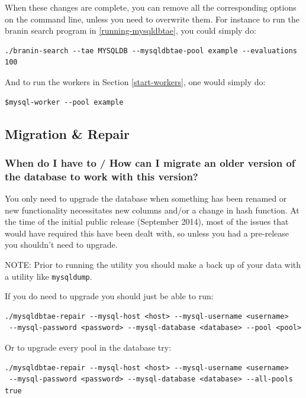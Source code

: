\documentclass[11pt,letterpaper,oneside]{article}
\begin{document}
When these changes are complete, you can remove all the corresponding options on the command line, unless you need to overwrite them. For instance to run the branin search program in \ref{running-mysqldbtae}, you could simply do:

\begin{verbatim}
./branin-search --tae MYSQLDB --mysqldbtae-pool example --evaluations 100
\end{verbatim}


And to run the workers in Section \ref{start-workers}, one would simply do:
\begin{verbatim}
$mysql-worker --pool example  
\end{verbatim}


\subsection{Migration \& Repair}
\label{repair}

\subsubsection{When do I have to / How can I migrate an older version of the database to work with this version?}

You only need to upgrade the database when something has been renamed or new functionality necessitates new columns and/or a change in hash function. At the time of the initial public release (September 2014), most of the issues that would have required this have been dealt with, so unless you had a pre-release you shouldn't need to upgrade. 

\textsc{NOTE}: Prior to running the utility you should make a back up of your data with a utility like \texttt{mysqldump}.


If you do need to upgrade you should just be able to run:

\begin{verbatim}
./mysqldbtae-repair --mysql-host <host> --mysql-username <username>
 --mysql-password <password> --mysql-database <database> --pool <pool>
\end{verbatim}

Or to upgrade every pool in the database try:

\begin{verbatim}
./mysqldbtae-repair --mysql-host <host> --mysql-username <username>
 --mysql-password <password> --mysql-database <database> --all-pools true
\end{verbatim}
\end{document}
